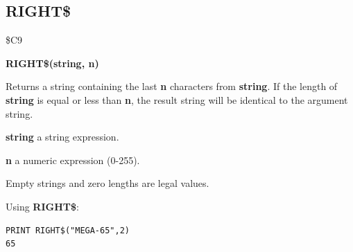 
\newpage
\subsection{RIGHT\$}
\begin{description}[leftmargin=2cm,style=nextline]
\item [Token:] \$C9
\item [Format:] {\bf RIGHT\$(string, n)}
\item [Usage:] Returns a string
               containing the last {\bf n} characters from {\bf string}.
               If the length of {\bf string} is equal or less than {\bf n},
               the result string will be identical to the argument string.

               {\bf string} a string expression.

               {\bf n} a numeric expression (0-255).

\item [Remarks:] Empty strings and zero lengths are legal values.

\item [Example:] Using {\bf RIGHT\$}:
\begin{tcolorbox}[colback=black,coltext=white]
\verbatimfont{\codefont}
\begin{verbatim}
PRINT RIGHT$("MEGA-65",2)
65
\end{verbatim}
\end{tcolorbox}
\end{description}


\newpage
